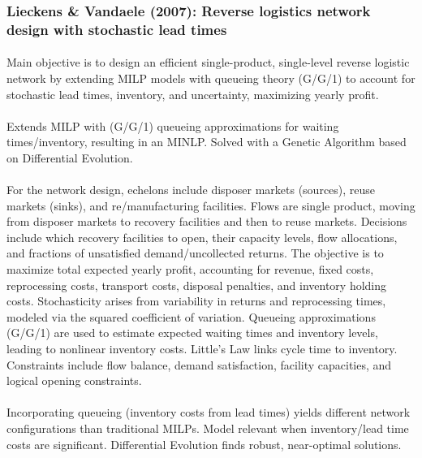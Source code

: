 \subsubsection{Lieckens \& Vandaele (2007): Reverse logistics network design with stochastic lead times}

\paragraph{} Main objective is to design an efficient single-product, single-level reverse logistic network by extending MILP models with queueing theory (G/G/1) to account for stochastic lead times, inventory, and uncertainty, maximizing yearly profit.

\paragraph{} Extends MILP with (G/G/1) queueing approximations for waiting times/inventory, resulting in an MINLP. Solved with a Genetic Algorithm based on Differential Evolution.

\paragraph{} For the network design, echelons include disposer markets (sources), reuse markets (sinks), and re/manufacturing facilities. Flows are single product, moving from disposer markets to recovery facilities and then to reuse markets. Decisions include which recovery facilities to open, their capacity levels, flow allocations, and fractions of unsatisfied demand/uncollected returns. The objective is to maximize total expected yearly profit, accounting for revenue, fixed costs, reprocessing costs, transport costs, disposal penalties, and inventory holding costs. Stochasticity arises from variability in returns and reprocessing times, modeled via the squared coefficient of variation. Queueing approximations (G/G/1) are used to estimate expected waiting times and inventory levels, leading to nonlinear inventory costs. Little's Law links cycle time to inventory. Constraints include flow balance, demand satisfaction, facility capacities, and logical opening constraints.

\paragraph{} Incorporating queueing (inventory costs from lead times) yields different network configurations than traditional MILPs. Model relevant when inventory/lead time costs are significant. Differential Evolution finds robust, near-optimal solutions.

